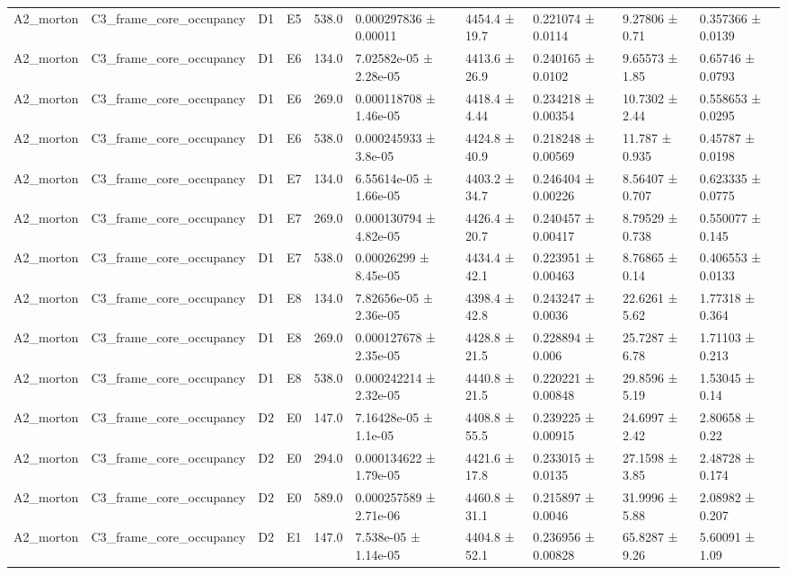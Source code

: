 \begin{table}
\begin{tabular}{llllllllll}
A2\_morton & C3\_frame\_core\_occupancy & D1 & E5 & 538.0 & 0.000297836 ± 0.00011 & 4454.4 ± 19.7 & 0.221074 ± 0.0114 & 9.27806 ± 0.71 & 0.357366 ± 0.0139 \\
A2\_morton & C3\_frame\_core\_occupancy & D1 & E6 & 134.0 & 7.02582e-05 ± 2.28e-05 & 4413.6 ± 26.9 & 0.240165 ± 0.0102 & 9.65573 ± 1.85 & 0.65746 ± 0.0793 \\
A2\_morton & C3\_frame\_core\_occupancy & D1 & E6 & 269.0 & 0.000118708 ± 1.46e-05 & 4418.4 ± 4.44 & 0.234218 ± 0.00354 & 10.7302 ± 2.44 & 0.558653 ± 0.0295 \\
A2\_morton & C3\_frame\_core\_occupancy & D1 & E6 & 538.0 & 0.000245933 ± 3.8e-05 & 4424.8 ± 40.9 & 0.218248 ± 0.00569 & 11.787 ± 0.935 & 0.45787 ± 0.0198 \\
A2\_morton & C3\_frame\_core\_occupancy & D1 & E7 & 134.0 & 6.55614e-05 ± 1.66e-05 & 4403.2 ± 34.7 & 0.246404 ± 0.00226 & 8.56407 ± 0.707 & 0.623335 ± 0.0775 \\
A2\_morton & C3\_frame\_core\_occupancy & D1 & E7 & 269.0 & 0.000130794 ± 4.82e-05 & 4426.4 ± 20.7 & 0.240457 ± 0.00417 & 8.79529 ± 0.738 & 0.550077 ± 0.145 \\
A2\_morton & C3\_frame\_core\_occupancy & D1 & E7 & 538.0 & 0.00026299 ± 8.45e-05 & 4434.4 ± 42.1 & 0.223951 ± 0.00463 & 8.76865 ± 0.14 & 0.406553 ± 0.0133 \\
A2\_morton & C3\_frame\_core\_occupancy & D1 & E8 & 134.0 & 7.82656e-05 ± 2.36e-05 & 4398.4 ± 42.8 & 0.243247 ± 0.0036 & 22.6261 ± 5.62 & 1.77318 ± 0.364 \\
A2\_morton & C3\_frame\_core\_occupancy & D1 & E8 & 269.0 & 0.000127678 ± 2.35e-05 & 4428.8 ± 21.5 & 0.228894 ± 0.006 & 25.7287 ± 6.78 & 1.71103 ± 0.213 \\
A2\_morton & C3\_frame\_core\_occupancy & D1 & E8 & 538.0 & 0.000242214 ± 2.32e-05 & 4440.8 ± 21.5 & 0.220221 ± 0.00848 & 29.8596 ± 5.19 & 1.53045 ± 0.14 \\
A2\_morton & C3\_frame\_core\_occupancy & D2 & E0 & 147.0 & 7.16428e-05 ± 1.1e-05 & 4408.8 ± 55.5 & 0.239225 ± 0.00915 & 24.6997 ± 2.42 & 2.80658 ± 0.22 \\
A2\_morton & C3\_frame\_core\_occupancy & D2 & E0 & 294.0 & 0.000134622 ± 1.79e-05 & 4421.6 ± 17.8 & 0.233015 ± 0.0135 & 27.1598 ± 3.85 & 2.48728 ± 0.174 \\
A2\_morton & C3\_frame\_core\_occupancy & D2 & E0 & 589.0 & 0.000257589 ± 2.71e-06 & 4460.8 ± 31.1 & 0.215897 ± 0.0046 & 31.9996 ± 5.88 & 2.08982 ± 0.207 \\
A2\_morton & C3\_frame\_core\_occupancy & D2 & E1 & 147.0 & 7.538e-05 ± 1.14e-05 & 4404.8 ± 52.1 & 0.236956 ± 0.00828 & 65.8287 ± 9.26 & 5.60091 ± 1.09 \\

\end{tabular}
\end{table}
